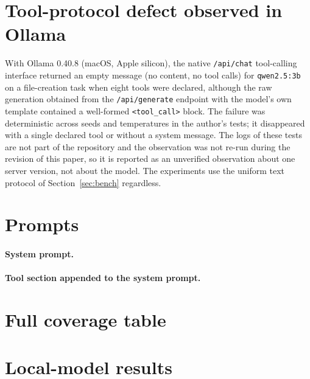 \section{Tool-protocol defect observed in Ollama}\label{app:ollama}
With Ollama 0.40.8 (macOS, Apple silicon), the native \texttt{/api/chat} tool-calling interface returned an empty message (no content, no tool calls) for \texttt{qwen2.5:3b} on a file-creation task when eight tools were declared, although the raw generation obtained from the \texttt{/api/generate} endpoint with the model's own template contained a well-formed \texttt{<tool\_call>} block. The failure was deterministic across seeds and temperatures in the author's tests; it disappeared with a single declared tool or without a system message. The logs of these tests are not part of the repository and the observation was not re-run during the revision of this paper, so it is reported as an unverified observation about one server version, not about the model. The experiments use the uniform text protocol of Section~\ref{sec:bench} regardless.

\section{Prompts}\label{app:prompts}
\paragraph{System prompt.}
{\small}
\paragraph{Tool section appended to the system prompt.}
{\small}

\section{Full coverage table}\label{app:tables}
\begin{table}[H]
\centering\footnotesize
\caption{Coverage (\%) of nominal 95\% intervals for the benchmark score; wilson, CP: pooled binomial intervals; the rest respect the task structure. $T$: tasks, $R$: runs per task.}

\end{table}
\section{Local-model results}\label{app:real}
\begin{table}[H]
\centering\footnotesize
\caption{Local models, \realNTasks{} tasks $\times$ \realNRuns{} runs. Score, pass$^3$, pass$^{10}$ in \%; steps: mean agent turns; step-limit: share of runs ending at the step budget; right columns: success rate (\%) per task family.}

\end{table}

